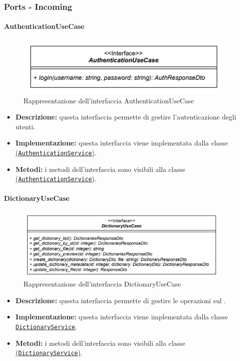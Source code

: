 \subsubsection{Ports - Incoming}

\paragraph{AuthenticationUseCase} \label{AuthenticationUseCase}
\begin{figure}[H]
    \centering
    \includegraphics[width=0.95\textwidth]{assets/Backend/authentication_use_case.png}
    \caption{Rappresentazione dell'interfaccia AuthenticationUseCase}
  \end{figure}
\begin{itemize}
    \item \textbf{Descrizione:} questa interfaccia permette di gestire l'autenticazione degli utenti. 
    \item \textbf{Implementazione:} questa interfaccia viene implementata dalla classe \hyperref[AuthenticationService]{(\texttt{AuthenticationService})}. 
    \item \textbf{Metodi:} i metodi dell'interfaccia sono visibili alla classe \hyperref[AuthenticationService]{(\texttt{AuthenticationService})}.
\end{itemize}  

\paragraph{DictionaryUseCase} \label{DictionaryUseCase}
\begin{figure}[H]
    \centering
    \includegraphics[width=0.95\textwidth]{assets/Backend/dictionary_use_case.png}
    \caption{Rappresentazione dell'interfaccia DictionaryUseCase}
  \end{figure}
\begin{itemize}
    \item \textbf{Descrizione:} questa interfaccia permette di gestire le operazioni sul .
    \item \textbf{Implementazione:} questa interfaccia viene implementata dalla classe \hyperref[DictionaryService]{\texttt{DictionaryService}}.
    \item \textbf{Metodi:} i metodi dell'interfaccia sono visibili alla classe \hyperref[DictionaryService]{(\texttt{DictionaryService})}.
\end{itemize}  

